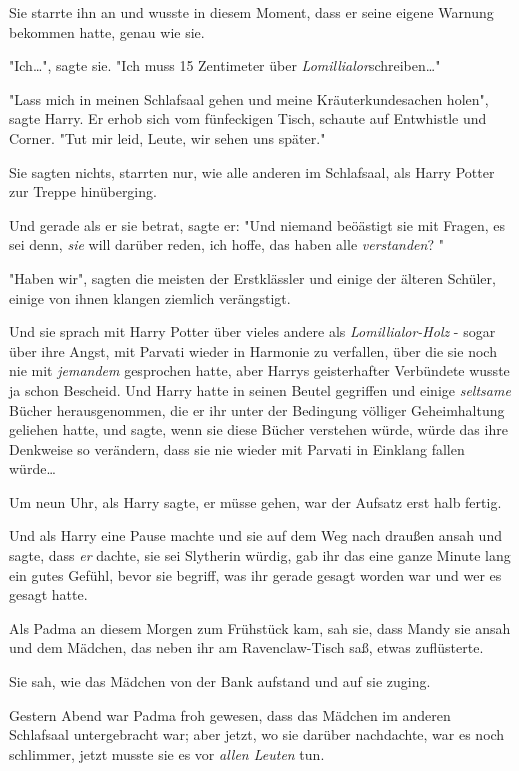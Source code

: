 {Sie starrte ihn an und wusste in diesem Moment, dass er seine eigene Warnung bekommen hatte, genau wie sie.

"Ich…", sagte sie. "Ich muss 15 Zentimeter über \emph{Lomillialor}schreiben…"

"Lass mich in meinen Schlafsaal gehen und meine Kräuterkundesachen holen", sagte Harry. Er erhob sich vom fünfeckigen Tisch, schaute auf Entwhistle und Corner. "Tut mir leid, Leute, wir sehen uns später."

Sie sagten nichts, starrten nur, wie alle anderen im Schlafsaal, als Harry Potter zur Treppe hinüberging.

Und gerade als er sie betrat, sagte er: "Und niemand beöästigt sie mit Fragen, es sei denn, \emph{sie} will darüber reden, ich hoffe, das haben alle \emph{verstanden}? "

"Haben wir", sagten die meisten der Erstklässler und einige der älteren Schüler, einige von ihnen klangen ziemlich verängstigt.

Und sie sprach mit Harry Potter über vieles andere als \emph{Lomillialor-Holz} - sogar über ihre Angst, mit Parvati wieder in Harmonie zu verfallen, über die sie noch nie mit \emph{jemandem} gesprochen hatte, aber Harrys geisterhafter Verbündete wusste ja schon Bescheid. Und Harry hatte in seinen Beutel gegriffen und einige \emph{seltsame} Bücher herausgenommen, die er ihr unter der Bedingung völliger Geheimhaltung geliehen hatte, und sagte, wenn sie diese Bücher verstehen würde, würde das ihre Denkweise so verändern, dass sie nie wieder mit Parvati in Einklang fallen würde…

Um neun Uhr, als Harry sagte, er müsse gehen, war der Aufsatz erst halb fertig.

Und als Harry eine Pause machte und sie auf dem Weg nach draußen ansah und sagte, dass \emph{er} dachte, sie sei Slytherin würdig, gab ihr das eine ganze Minute lang ein gutes Gefühl, bevor sie begriff, was ihr gerade gesagt worden war und wer es gesagt hatte.

Als Padma an diesem Morgen zum Frühstück kam, sah sie, dass Mandy sie ansah und dem Mädchen, das neben ihr am Ravenclaw-Tisch saß, etwas zuflüsterte.

Sie sah, wie das Mädchen von der Bank aufstand und auf sie zuging.

Gestern Abend war Padma froh gewesen, dass das Mädchen im anderen Schlafsaal untergebracht war; aber jetzt, wo sie darüber nachdachte, war es noch schlimmer, jetzt musste sie es vor \emph{allen Leuten} tun.

}
